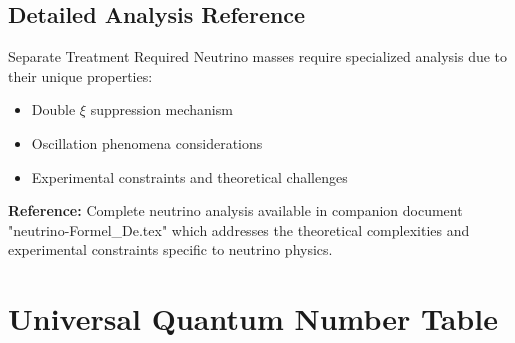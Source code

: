 \documentclass[12pt,a4paper]{article}
\begin{document}
	\subsection{Detailed Analysis Reference}
	\label{subsec:detailed_analysis_reference}
	
	\begin{neutrino}{Separate Treatment Required}{}
		Neutrino masses require specialized analysis due to their unique properties:
		\begin{itemize}
			\item Double $\xi$ suppression mechanism
			\item Oscillation phenomena considerations  
			\item Experimental constraints and theoretical challenges
		\end{itemize}
		
		\textbf{Reference:} Complete neutrino analysis available in companion document "neutrino-Formel\_De.tex" which addresses the theoretical complexities and experimental constraints specific to neutrino physics.
	\end{neutrino}
	
	\section{Universal Quantum Number Table}
	\label{sec:universal_quantum_numbers}
	
\end{document}
